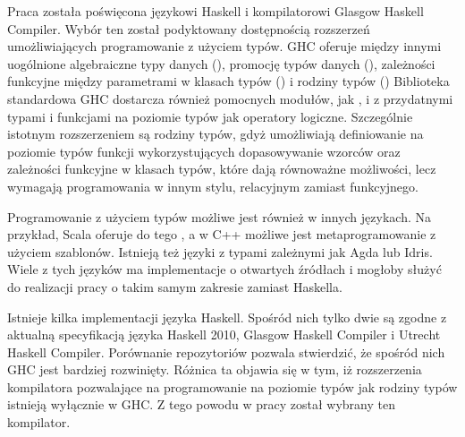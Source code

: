 Praca została poświęcona językowi Haskell i kompilatorowi Glasgow Haskell
Compiler. Wybór ten został podyktowany dostępnością rozszerzeń umożliwiających
programowanie z użyciem typów.
GHC oferuje między innymi uogólnione algebraiczne
typy danych (\cite{ExtPhantomTypes}\cite{ExtGADTs}),
promocję typów danych (\cite{ExtPromotion}),
zależności funkcyjne między parametrami w klasach typów
(\cite{ExtFunDeps})
i rodziny typów (\cite{ExtAssocTyFams}\cite{ExtAssocTypesWithClass}\cite{ExtClosedTyFams})
Biblioteka standardowa GHC dostarcza również pomocnych modułów, jak ,
 i  z przydatnymi typami i funkcjami na poziomie
typów jak operatory logiczne.
Szczególnie istotnym rozszerzeniem są rodziny typów, gdyż umożliwiają
definiowanie na poziomie typów funkcji wykorzystujących
dopasowywanie wzorców oraz zależności funkcyjne w klasach typów,
które dają równoważne możliwości,
lecz wymagają programowania w innym stylu,
relacyjnym zamiast funkcyjnego.

Programowanie z użyciem typów możliwe jest również w innych językach. Na przykład,
Scala oferuje do tego , a w C++ możliwe jest
metaprogramowanie z użyciem szablonów. Istnieją też języki z typami zależnymi
jak Agda lub Idris. Wiele z tych języków ma implementacje o otwartych źródłach i
mogłoby służyć do realizacji pracy o takim samym zakresie zamiast Haskella.

Istnieje kilka implementacji języka Haskell. Spośród nich tylko dwie są zgodne z
aktualną specyfikacją języka Haskell 2010, Glasgow Haskell Compiler i Utrecht
Haskell Compiler\cite{WikiImplementations}. Porównanie repozytoriów pozwala
stwierdzić, że spośród nich GHC jest bardziej rozwinięty. Różnica ta objawia się
w tym, iż rozszerzenia kompilatora pozwalające na programowanie na poziomie
typów jak rodziny typów istnieją wyłącznie w GHC\cite{UHCUserGuide}. Z tego
powodu w pracy został wybrany ten kompilator.

